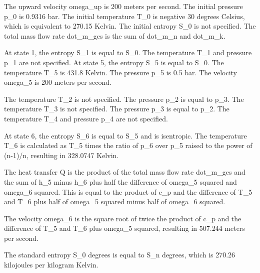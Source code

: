 The upward velocity omega_up is 200 meters per second.
The initial pressure p_0 is 0.9316 bar.
The initial temperature T_0 is negative 30 degrees Celsius, which is equivalent to 270.15 Kelvin.
The initial entropy S_0 is not specified.
The total mass flow rate dot_m_ges is the sum of dot_m_n and dot_m_k.

At state 1, the entropy S_1 is equal to S_0.
The temperature T_1 and pressure p_1 are not specified.
At state 5, the entropy S_5 is equal to S_0.
The temperature T_5 is 431.8 Kelvin.
The pressure p_5 is 0.5 bar.
The velocity omega_5 is 200 meters per second.

The temperature T_2 is not specified.
The pressure p_2 is equal to p_3.
The temperature T_3 is not specified.
The pressure p_3 is equal to p_2.
The temperature T_4 and pressure p_4 are not specified.

At state 6, the entropy S_6 is equal to S_5 and is isentropic.
The temperature T_6 is calculated as T_5 times the ratio of p_6 over p_5 raised to the power of (n-1)/n, resulting in 328.0747 Kelvin.

The heat transfer Q is the product of the total mass flow rate dot_m_ges and the sum of h_5 minus h_6 plus half the difference of omega_5 squared and omega_6 squared.
This is equal to the product of c_p and the difference of T_5 and T_6 plus half of omega_5 squared minus half of omega_6 squared.

The velocity omega_6 is the square root of twice the product of c_p and the difference of T_5 and T_6 plus omega_5 squared, resulting in 507.244 meters per second.

The standard entropy S_0 degrees is equal to S_n degrees, which is 270.26 kilojoules per kilogram Kelvin.